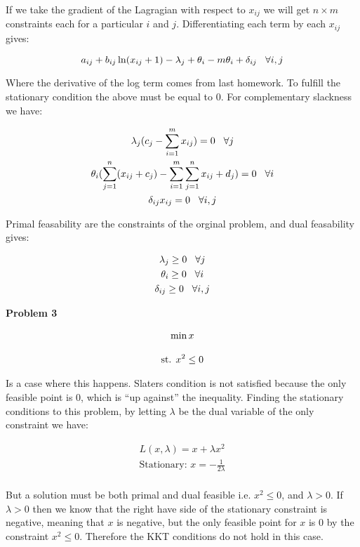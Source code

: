 \documentclass{article}
\begin{document}
If we take the gradient of the Lagragian with respect to $x_{ij}$ we will get $n \times m $ constraints each for a particular $i$ and $j$. Differentiating each term by each $x_{ij}$ gives:

$$a_{ij} + b_{ij}\ln(x_{ij} + 1) - \lambda_j + \theta_i - m\theta_i + \delta_{ij} \hspace{3mm}  \forall i,j$$

Where the derivative of the log term comes from last homework.
To fulfill the stationary condition the above must be equal to 0.
For complementary slackness we have:

\begin{gather*}
  \lambda_j (c_j - \sum_{i=1}^m x_{ij}) = 0 \hspace{3mm} \forall j \\
  \theta_i (\sum_{j=1}^n (x_{ij} + c_j) - \sum_{i=1}^m \sum_{j=1}^n x_{ij} + d_j) = 0 \hspace{3mm} \forall i \\
  \delta_{ij}x_{ij} = 0 \hspace{3mm} \forall i,j \\
  \end{gather*}

Primal feasability are the constraints of the orginal problem, and dual feasability gives:

\begin{gather*}
  \lambda_j \geq 0 \hspace{3mm} \forall j\\
  \theta_i \geq 0 \hspace{3mm} \forall i\\
  \delta_{ij} \geq 0 \hspace{3mm} \forall i,j\\
\end{gather*}



\vspace{5mm}
\noindent\textbf{Problem 3}

\begin{gather*}
  \min \vspace{3mm} x\\
  \text{st.  } x^2 \leq 0
\end{gather*}
  
Is a case where this happens. Slaters condition is not satisfied because the only feasible point is 0, which is ``up against'' the inequality. Finding the stationary conditions to this problem, by letting $\lambda$ be the dual variable of the only constraint we have:

\begin{gather*}
  L(x,\lambda) = x + \lambda x^2  \\
  \text{Stationary:  } x = -\frac{1}{2\lambda}\\
\end{gather*}

But a solution must be both primal and dual feasible i.e. $x^2 \leq 0$, and $\lambda > 0$. If $\lambda > 0$ then we know that the right have side of the stationary constraint is negative, meaning that $x$ is negative, but the only feasible point for $x$ is 0 by the constraint $x^2 \leq 0$. Therefore the KKT conditions do not hold in this case. 
\end{document}
